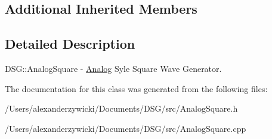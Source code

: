 \subsection*{Additional Inherited Members}


\subsection{Detailed Description}
D\+S\+G\+::\+Analog\+Square -\/ \hyperlink{namespace_d_s_g_1_1_analog}{Analog} Syle Square Wave Generator. 

The documentation for this class was generated from the following files\+:\begin{DoxyCompactItemize}
\item 
/\+Users/alexanderzywicki/\+Documents/\+D\+S\+G/src/Analog\+Square.\+h\item 
/\+Users/alexanderzywicki/\+Documents/\+D\+S\+G/src/Analog\+Square.\+cpp\end{DoxyCompactItemize}

